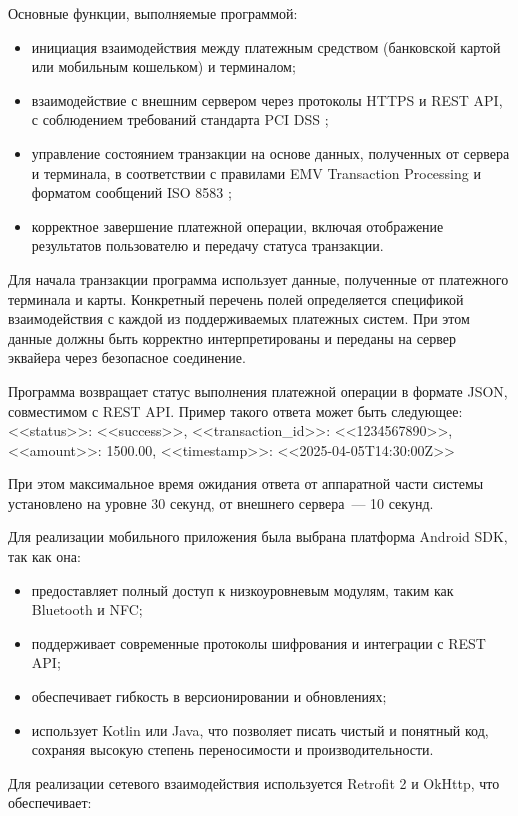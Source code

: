 Основные функции, выполняемые программой:
\begin{itemize}
    \item инициация взаимодействия между платежным средством (банковской картой или мобильным кошельком) и терминалом;
    \item взаимодействие с внешним сервером через протоколы HTTPS и REST API, с соблюдением требований стандарта PCI DSS ;
    \item управление состоянием транзакции на основе данных, полученных от сервера и терминала, в соответствии с правилами EMV Transaction Processing и форматом сообщений ISO 8583 ;
    \item корректное завершение платежной операции, включая отображение результатов пользователю и передачу статуса транзакции.
\end{itemize}

Для начала транзакции программа использует данные, полученные от платежного терминала и карты.
Конкретный перечень полей определяется спецификой взаимодействия с каждой из поддерживаемых платежных систем.
При этом данные должны быть корректно интерпретированы и переданы на сервер эквайера через безопасное соединение.

Программа возвращает статус выполнения платежной операции в формате JSON, совместимом с REST API.
Пример такого ответа может быть следующее:
{
    <<status>>: <<success>>,
    <<transaction\_id>>: <<1234567890>>,
    <<amount>>: 1500.00,
    <<timestamp>>: <<2025-04-05T14:30:00Z>>
}

При этом максимальное время ожидания ответа от аппаратной части системы установлено на уровне 30 секунд, от внешнего сервера~--- 10 секунд.


Для реализации мобильного приложения была выбрана платформа Android SDK, так как она:
\begin{itemize}
    \item предоставляет полный доступ к низкоуровневым модулям, таким как Bluetooth и NFC;
    \item поддерживает современные протоколы шифрования и интеграции с REST API;
    \item обеспечивает гибкость в версионировании и обновлениях;
    \item использует Kotlin или Java, что позволяет писать чистый и понятный код, сохраняя высокую степень переносимости и производительности.
\end{itemize}

Для реализации сетевого взаимодействия используется Retrofit 2 и OkHttp, что обеспечивает:

